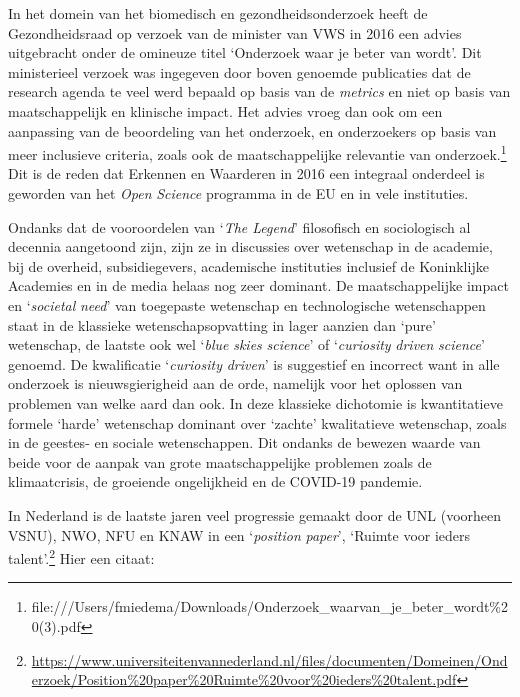 \documentclass[smallauthor, chapterhaspagenum, nochapterinheader, pagenuminheader,  bigchapnum,medium2, tocpages,  garamond, titleinheader]{jote-book}
\begin{document}
	In het domein van het biomedisch en gezondheidsonderzoek heeft de Gezondheidsraad op verzoek van de minister van VWS in 2016 een advies uitgebracht onder de omineuze titel ‘Onderzoek waar je beter van wordt'. Dit ministerieel verzoek was ingegeven door boven genoemde publicaties dat de research agenda te veel werd bepaald op basis van de \emph{metrics} en niet op basis van maatschappelijk en klinische impact. Het advies vroeg dan ook om een aanpassing van de beoordeling van het onderzoek, en onderzoekers op basis van meer inclusieve criteria, zoals ook de maatschappelijke relevantie van onderzoek.\footnote{file:///Users/fmiedema/Downloads/Onderzoek\_waarvan\_je\_beter\_wordt\%20(3).pdf} Dit is de reden dat Erkennen en Waarderen in 2016 een integraal onderdeel is geworden van het \emph{Open }\emph{Science} programma in de EU en in vele instituties.



	Ondanks dat de vooroordelen van ‘\emph{The Legend}' filosofisch en sociologisch al decennia aangetoond zijn, zijn ze in discussies over wetenschap in de academie, bij de overheid, subsidiegevers, academische instituties inclusief de Koninklijke Academies en in de media helaas nog zeer dominant. De maatschappelijke impact en ‘\emph{societal}\emph{ }\emph{need}' van toegepaste wetenschap en technologische wetenschappen staat in de klassieke wetenschapsopvatting in lager aanzien dan ‘pure' wetenschap, de laatste ook wel ‘\emph{blue }\emph{skies}\emph{ }\emph{science}' of ‘\emph{curiosity}\emph{ }\emph{driven}\emph{ }\emph{science}' genoemd. De kwalificatie ‘\emph{curiosity}\emph{ }\emph{driven}' is suggestief en incorrect want in alle onderzoek is nieuwsgierigheid aan de orde, namelijk voor het oplossen van problemen van welke aard dan ook. In deze klassieke dichotomie is kwantitatieve formele ‘harde' wetenschap dominant over ‘zachte' kwalitatieve wetenschap, zoals in de geestes- en sociale wetenschappen. Dit ondanks de bewezen waarde van beide voor de aanpak van grote maatschappelijke problemen zoals de klimaatcrisis, de groeiende ongelijkheid en de COVID-19 pandemie.



	In Nederland is de laatste jaren veel progressie gemaakt door de UNL (voorheen VSNU), NWO, NFU en KNAW in een ‘\emph{position}\emph{ paper}', ‘Ruimte voor ieders talent'.\footnote{\href{https://www.universiteitenvannederland.nl/files/documenten/Domeinen/Onderzoek/Position\%20paper\%20Ruimte\%20voor\%20ieders\%20talent.pdf}{https://www.universiteitenvannederland.nl/files/documenten/Domeinen/Onderzoek/Position\%20paper\%20Ruimte\%20voor\%20ieders\%20talent.pdf}} Hier een citaat:
\end{document}
